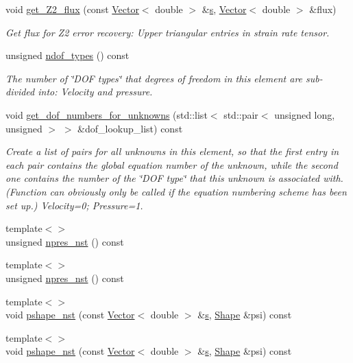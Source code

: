 \begin{DoxyCompactItemize}
void \hyperlink{classoomph_1_1TTaylorHoodElement_a6442b4be0666587043f9a837c0054519}{get\+\_\+\+Z2\+\_\+flux} (const \hyperlink{classoomph_1_1Vector}{Vector}$<$ double $>$ \&\hyperlink{cfortran_8h_ab7123126e4885ef647dd9c6e3807a21c}{s}, \hyperlink{classoomph_1_1Vector}{Vector}$<$ double $>$ \&flux)
\begin{DoxyCompactList}\small\item\em Get \textquotesingle{}flux\textquotesingle{} for Z2 error recovery\+: Upper triangular entries in strain rate tensor. \end{DoxyCompactList}\item 
unsigned \hyperlink{classoomph_1_1TTaylorHoodElement_ab4b5b18fb755a690e296b2ed00b32647}{ndof\+\_\+types} () const
\begin{DoxyCompactList}\small\item\em The number of \char`\"{}\+D\+O\+F types\char`\"{} that degrees of freedom in this element are sub-\/divided into\+: Velocity and pressure. \end{DoxyCompactList}\item 
void \hyperlink{classoomph_1_1TTaylorHoodElement_ab575a23e0341900bcd8b02732319a45d}{get\+\_\+dof\+\_\+numbers\+\_\+for\+\_\+unknowns} (std\+::list$<$ std\+::pair$<$ unsigned long, unsigned $>$ $>$ \&dof\+\_\+lookup\+\_\+list) const
\begin{DoxyCompactList}\small\item\em Create a list of pairs for all unknowns in this element, so that the first entry in each pair contains the global equation number of the unknown, while the second one contains the number of the \char`\"{}\+D\+O\+F type\char`\"{} that this unknown is associated with. (Function can obviously only be called if the equation numbering scheme has been set up.) Velocity=0; Pressure=1. \end{DoxyCompactList}\item 
{\footnotesize template$<$$>$ }\\unsigned \hyperlink{classoomph_1_1TTaylorHoodElement_a2e07d9fa250ad11396677a14f6d21a4a}{npres\+\_\+nst} () const
\item 
{\footnotesize template$<$$>$ }\\unsigned \hyperlink{classoomph_1_1TTaylorHoodElement_a48bd219a6eb03eccd3c375b61204df36}{npres\+\_\+nst} () const
\item 
{\footnotesize template$<$$>$ }\\void \hyperlink{classoomph_1_1TTaylorHoodElement_a38f381e73312dd3659a3f5fa1c18e2dd}{pshape\+\_\+nst} (const \hyperlink{classoomph_1_1Vector}{Vector}$<$ double $>$ \&\hyperlink{cfortran_8h_ab7123126e4885ef647dd9c6e3807a21c}{s}, \hyperlink{classoomph_1_1Shape}{Shape} \&psi) const
\item 
{\footnotesize template$<$$>$ }\\void \hyperlink{classoomph_1_1TTaylorHoodElement_ac060f5a09eb0fe6e0d3db255fa8cbceb}{pshape\+\_\+nst} (const \hyperlink{classoomph_1_1Vector}{Vector}$<$ double $>$ \&\hyperlink{cfortran_8h_ab7123126e4885ef647dd9c6e3807a21c}{s}, \hyperlink{classoomph_1_1Shape}{Shape} \&psi) const
\end{DoxyCompactItemize}
